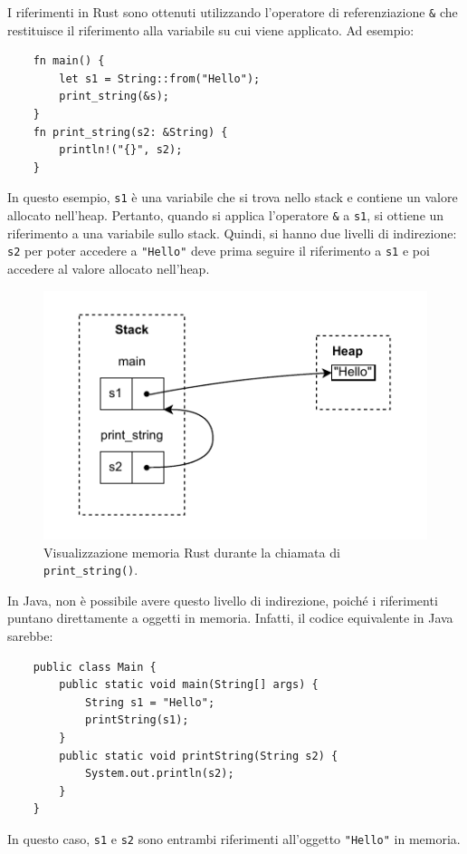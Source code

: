 I riferimenti in Rust sono ottenuti utilizzando l'operatore di referenziazione \texttt{\&} che restituisce il riferimento alla variabile su cui viene applicato. Ad esempio:
\begin{verbatim}
    fn main() {
        let s1 = String::from("Hello");
        print_string(&s); 
    }
    fn print_string(s2: &String) {
        println!("{}", s2);
    }
\end{verbatim} 
In questo esempio, \texttt{s1} è una variabile che si trova nello stack e contiene un valore allocato nell'heap. Pertanto, quando si applica l'operatore \texttt{\&} a \texttt{s1}, si ottiene un riferimento a una variabile sullo stack. Quindi, si hanno due livelli di indirezione: \texttt{s2} per poter accedere a \texttt{"Hello"} deve prima seguire il riferimento a \texttt{s1} e poi accedere al valore allocato nell'heap.  
\begin{figure}[H]
    \label{fig:bor1}
    \centering
    \includegraphics[scale = 1]{Figures/bor1.drawio.pdf}
    \caption{Visualizzazione memoria Rust durante la chiamata di \texttt{print\_string()}.}
\end{figure} 
In Java, non è possibile avere questo livello di indirezione, poiché i riferimenti puntano direttamente a oggetti in memoria. Infatti, il codice equivalente in Java sarebbe:
\begin{verbatim}
    public class Main {
        public static void main(String[] args) {
            String s1 = "Hello";
            printString(s1); 
        }
        public static void printString(String s2) {
            System.out.println(s2);
        }
    }
\end{verbatim}
In questo caso, \texttt{s1} e \texttt{s2} sono entrambi riferimenti all'oggetto \texttt{"Hello"} in memoria.
